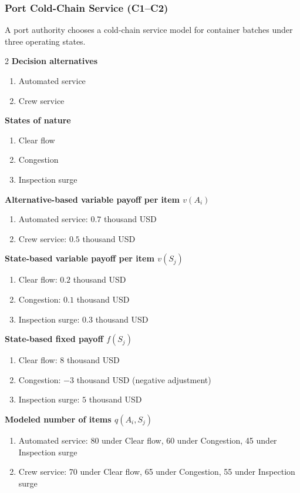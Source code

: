 	\subsubsection{Port Cold-Chain Service (C1--C2)}
	\label{sec:problem29-port-cold-chain-service-c1-c2}
	A port authority chooses a cold-chain service model for container batches under three operating states.
	\begin{multicols}{2}
	\textbf{Decision alternatives}
	\begin{enumerate}[label=\arabic*.]
\item Automated service
\item Crew service
	\end{enumerate}
	\textbf{States of nature}
	\begin{enumerate}[label=\arabic*.]
\item Clear flow
\item Congestion
\item Inspection surge
	\end{enumerate}
	\columnbreak
	\textbf{Alternative-based variable payoff per item $v(A_i)$}
\begin{enumerate}[label=\arabic*.]
\item Automated service: $0.7$ thousand USD
\item Crew service: $0.5$ thousand USD\end{enumerate}
\textbf{State-based variable payoff per item $v(S_j)$}
\begin{enumerate}[label=\arabic*.]
\item Clear flow: $0.2$ thousand USD
\item Congestion: $0.1$ thousand USD
\item Inspection surge: $0.3$ thousand USD\end{enumerate}
\textbf{State-based fixed payoff $f(S_j)$}
\begin{enumerate}[label=\arabic*.]
\item Clear flow: $8$ thousand USD
\item Congestion: $-3$ thousand USD (negative adjustment)
\item Inspection surge: $5$ thousand USD\end{enumerate}
\textbf{Modeled number of items $q(A_i,S_j)$}
\begin{enumerate}[label=\arabic*.]
\item Automated service: 80 under Clear flow, 60 under Congestion, 45 under Inspection surge
\item Crew service: 70 under Clear flow, 65 under Congestion, 55 under Inspection surge
\end{enumerate}
	\end{multicols}

